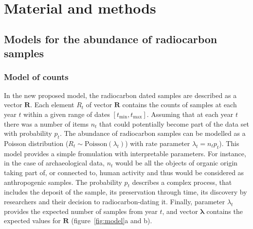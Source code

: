\documentclass[a4paper]{article}
\begin{document}


\section*{\centering Material and methods}


\subsection*{Models for the abundance of radiocarbon samples}

\subsubsection*{Model of counts}

In the new proposed model, the radiocarbon dated samples are described as a vector $\bm{R}$. Each element $R_t$ of vector $\bm{R}$ contains the counts of samples at each year $t$ within a given range of dates $\left[t_{\min},t_{\max}\right]$. Assuming that at each year $t$ there was a number of items $n_t$ that could potentially become part of the data set with probability $p_t$. The abundance of radiocarbon samples can be modelled as a Poisson distribution ($R_t \sim \mathrm{Poisson}(\lambda_t)$) with rate parameter $\lambda_t=n_tp_t$). This model provides a simple fromulation with interpretable parameters. 
For instance, in the case of archaeological data, $n_t$ would be all the objects of organic origin taking part of, or connected to, human activity and thus would be considered as anthropogenic samples. The probability $p_t$ describes a complex process, that includes the deposit of the sample, its preservation through time, its discovery by researchers and their decision to radiocarbon-dating it. %
Finally, parameter $\lambda_t$ provides the expected number of samples from year $t$, and vector $\bm{\lambda}$ contains the expected values for $\bm{R}$ (figure~\ref{fig:model}a and b).%
\\
\end{document}
